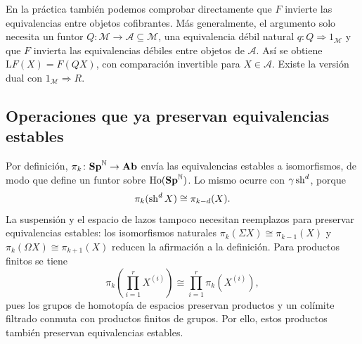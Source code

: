En la práctica también podemos comprobar directamente que $F$ invierte las equivalencias entre objetos cofibrantes. Más generalmente, el argumento solo necesita un funtor $Q\colon\mathcal M\to\mathcal A\subseteq\mathcal M$, una equivalencia débil natural $q\colon Q\Rightarrow1_{\mathcal M}$ y que $F$ invierta las equivalencias débiles entre objetos de $\mathcal A$. Así se obtiene $\mathrm LF(X)=F(QX)$, con comparación invertible para $X\in\mathcal A$. Existe la versión dual con $1_{\mathcal M}\Rightarrow R$.

\subsection{Operaciones que ya preservan equivalencias estables}

Por definición, $\pi_k\colon\mathbf{Sp}^{\mathbb N}\to\mathbf{Ab}$ envía las equivalencias estables a isomorfismos, de modo que define un funtor sobre $\operatorname{Ho}(\mathbf{Sp}^{\mathbb N})$. Lo mismo ocurre con $\gamma\operatorname{sh}^d$, porque
\[
\pi_k(\operatorname{sh}^dX)\cong\pi_{k-d}(X).
\]
La suspensión y el espacio de lazos tampoco necesitan reemplazos para preservar equivalencias estables: los isomorfismos naturales $\pi_k(\Sigma X)\cong\pi_{k-1}(X)$ y $\pi_k(\Omega X)\cong\pi_{k+1}(X)$ reducen la afirmación a la definición. Para productos finitos se tiene
\[
\pi_k\left(\prod_{i=1}^rX^{(i)}\right)
\cong\prod_{i=1}^r\pi_k(X^{(i)}),
\]
pues los grupos de homotopía de espacios preservan productos y un colímite filtrado conmuta con productos finitos de grupos. Por ello, estos productos también preservan equivalencias estables.

